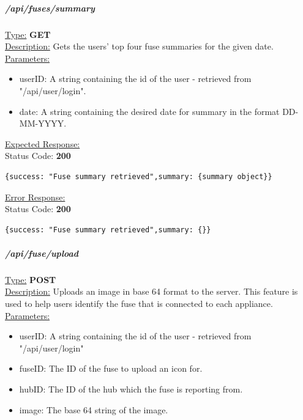 \documentclass[draft,preprint,12pt,3p]{elsarticle}
\newcommand{\forceindent}{\leavevmode{\parindent=1em\indent}}
\begin{document}
\subparagraph*{/api/fuses/summary}
\underline{Type:} \textbf{GET}\\

\underline{Description:} Gets the users' top four fuse summaries for the given date.\\

\underline{Parameters:}
\begin{itemize}
\item userID: A string containing the id of the user - retrieved from "/api/user/login".

\item date: A string containing the desired date for summary in the format DD-MM-YYYY.

\end{itemize}
\underline{Expected Response:}\\[5pt]
\forceindent Status Code: \textbf{200} \\
\begin{verbatim}
{success: "Fuse summary retrieved",summary: {summary object}}
\end{verbatim}
\underline{Error Response:}\\[5pt]
\forceindent Status Code: \textbf{200} \\
\begin{verbatim}
{success: "Fuse summary retrieved",summary: {}}
\end{verbatim}

\subparagraph*{/api/fuse/upload}
\underline{Type:} \textbf{POST}\\

\underline{Description:} Uploads an image in base 64 format to the server. This feature is used to help users identify the fuse that is connected to each appliance.\\

\underline{Parameters:}
\begin{itemize}
\item userID: A string containing the id of the user - retrieved from "/api/user/login"

\item fuseID: The ID of the fuse to upload an icon for.

\item hubID: The ID of the hub which the fuse is reporting from.

\item image: The base 64 string of the image.
\end{itemize}
\end{document}
